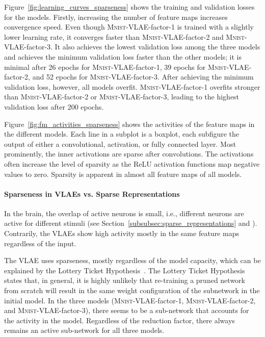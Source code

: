 Figure~\ref{fig:learning_curves_sparseness} shows the training and validation losses for the models.
Firstly, increasing the number of feature maps increases convergence speed.
Even though \textsc{Mnist}-\ac{VLAE}-factor-1 is trained with a slightly lower learning rate, it converges faster than \textsc{Mnist}-\ac{VLAE}-factor-2 and \textsc{Mnist}-\ac{VLAE}-factor-3.
It also achieves the lowest validation loss among the three models and achieves the minimum validation loss faster than the other models; it is minimal after 26 epochs for \textsc{Mnist}-\ac{VLAE}-factor-1, 39 epochs for \textsc{Mnist}-\ac{VLAE}-factor-2, and 52 epochs for \textsc{Mnist}-\ac{VLAE}-factor-3.
After achieving the minimum validation loss, however, all models overfit.
\textsc{Mnist}-\ac{VLAE}-factor-1 overfits stronger than \textsc{Mnist}-\ac{VLAE}-factor-2 or \textsc{Mnist}-\ac{VLAE}-factor-3, leading to the highest validation loss after 200 epochs.

Figure~\ref{fig:fm_activities_sparseness} shows the activities of the feature maps in the different models.
Each line in a subplot is a boxplot, each subfigure the output of either a convolutional, activation, or fully connected layer.
Most prominently, the inner activations are sparse after convolutions.
The activations often increase the level of sparsity as the ReLU activation functions map negative values to zero.
Sparsity is apparent in almost all feature maps of all models.

\paragraph{Sparseness in \acp{VLAE} vs. Sparse Representations}
In the brain, the overlap of active neurons is small, i.e., different neurons are active for different stimuli (see Section~\ref{subsubsec:sparse_representations} and \citet{yoshida2020natural}).
Contrarily, the \acp{VLAE} show high activity mostly in the same feature maps regardless of the input.

The \ac{VLAE} uses sparseness, mostly regardless of the model capacity, which can be explained by the Lottery Ticket Hypothesis~\citep{frankle2018lottery}.
The Lottery Ticket Hypothesis states that, in general, it is highly unlikely that re-training a pruned network from scratch will result in the same weight configuration of the subnetwork in the initial model.
In the three models (\textsc{Mnist}-\ac{VLAE}-factor-1, \textsc{Mnist}-\ac{VLAE}-factor-2, and \textsc{Mnist}-\ac{VLAE}-factor-3), there seems to be a sub-network that accounts for the activity in the model.
Regardless of the reduction factor, there always remains an active sub-network for all three models.

